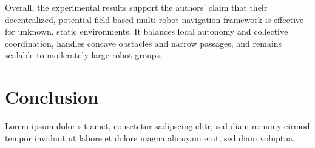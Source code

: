 \documentclass[conference]{IEEEtran}
\begin{document}
Overall, the experimental results support the authors' claim that their decentralized, potential field-based multi-robot navigation 
framework is effective for unknown, static environments. It balances local autonomy and collective coordination, handles concave 
obstacles and narrow passages, and remains scalable to moderately large robot groups.


\section{Conclusion}
Lorem ipsum dolor sit amet, consetetur sadipscing elitr, sed diam nonumy eirmod tempor invidunt ut labore et dolore magna aliquyam erat, sed diam voluptua.




\end{document}
